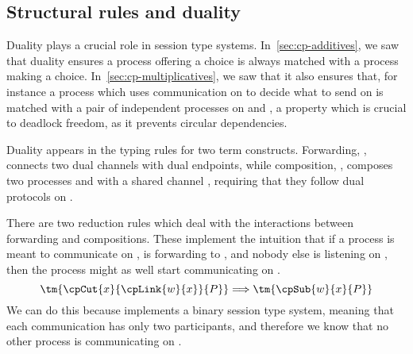 \documentclass[UKenglish]{llncs}
\begin{document}
\subsection{Structural rules and duality}
\label{sec:cp-duality}
Duality plays a crucial role in session type systems.
In~\cref{sec:cp-additives}, we saw that duality ensures a process offering a choice
is always matched with a process making a choice.
In~\cref{sec:cp-multiplicatives}, we saw that it also ensures that, for instance
a process which uses communication on  to decide what to send on  is
matched with a pair of independent processes on  and , a property
which is crucial to deadlock freedom, as it prevents circular dependencies. 

Duality appears in the typing rules for two \cp term constructs.
Forwarding, , connects two dual channels with dual endpoints,
while composition, , composes two processes  and
 with a shared channel , requiring that they follow dual protocols
on .
\begin{center}
  \cpInfAx
  \cpInfCut
\end{center}
There are two reduction rules which deal with the interactions between
forwarding and compositions. These implement the intuition that if a process is
meant to communicate on ,  is forwarding to , and nobody else
is listening on , then the process might as well start communicating on
.
\[
  \tm{\cpCut{x}{\cpLink{w}{x}}{P}} \Longrightarrow \tm{\cpSub{w}{x}{P}} 
\]
We can do this because \cp implements a binary session type system, meaning
that each communication has only two participants, and therefore we know that no
other process is communicating on .
\end{document}

